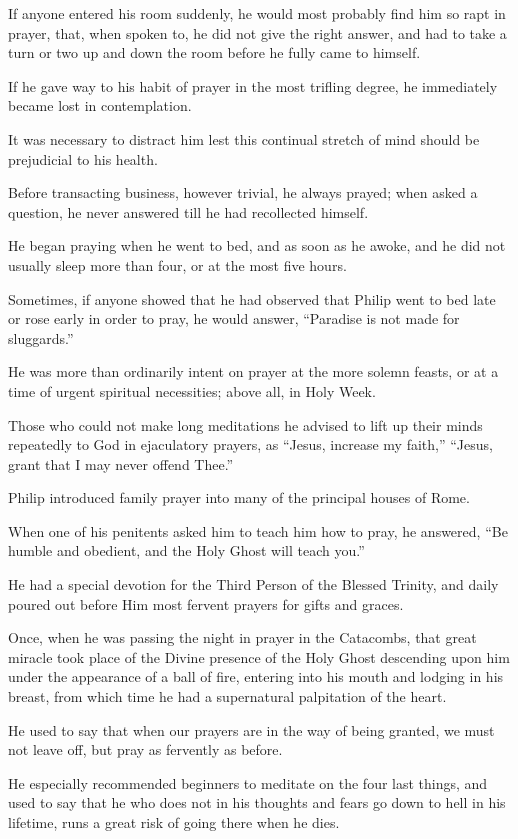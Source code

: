 If anyone entered his room
suddenly, he would most probably find him so rapt in prayer, that, when
spoken to, he did not give the right answer, and had to take a turn or
two up and down the room before he fully came to himself.

If he gave way to his habit of
prayer in the most trifling degree, he immediately became lost in
contemplation.

It was necessary to distract him
lest this continual stretch of mind should be prejudicial to his health.

Before transacting business,
however trivial, he always prayed; when asked a question, he never
answered till he had recollected himself.

He began praying when he went to
bed, and as soon as he awoke, and he did not usually sleep more than
four, or at the most five hours.

Sometimes, if anyone showed that
he had observed that Philip went to bed late or rose early in order to
pray, he would answer, ``Paradise is not made for sluggards.''

He was more than ordinarily
intent on prayer at the more solemn feasts, or at a time of urgent
spiritual necessities; above all, in Holy Week.

Those who could not make long
meditations he advised to lift up their minds repeatedly to God in
ejaculatory prayers, as ``Jesus, increase my faith,'' ``Jesus, grant that I
may never offend Thee.''

Philip introduced family prayer
into many of the principal houses of Rome.

When one of his penitents asked
him to teach him how to pray, he answered, ``Be humble and obedient, and
the Holy Ghost will teach you.''

He had a special devotion for
the Third Person of the Blessed Trinity, and daily poured out before Him
most fervent prayers for gifts and graces.

Once, when he was passing the
night in prayer in the Catacombs, that great miracle took place of the
Divine presence of the Holy Ghost descending upon him under the
appearance of a ball of fire, entering into his mouth and lodging in his
breast, from which time he had a supernatural palpitation of the heart.

He used to say that when our
prayers are in the way of being granted, we must not leave off, but pray
as fervently as before.

He especially recommended
beginners to meditate on the four last things, and used to say that he
who does not in his thoughts and fears go down to hell in his lifetime,
runs a great risk of going there when he dies.

